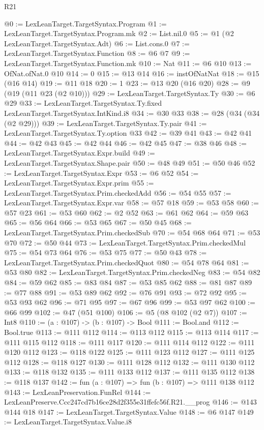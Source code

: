 \begin{lexlean}{R21}
\begin{coremodule}
@0 := LexLeanTarget.TargetSyntax.Program
@1 := LexLeanTarget.TargetSyntax.Program.mk
@2 := List.nil.{0}
@5 := @1 (@2 LexLeanTarget.TargetSyntax.Adt)
@6 := List.cons.{0}
@7 := LexLeanTarget.TargetSyntax.Function
@8 := @6 @7
@9 := LexLeanTarget.TargetSyntax.Function.mk
@10 := Nat
@11 := @6 @10
@13 := OfNat.ofNat.{0} @10
@14 := 0
@15 := @13 @14
@16 := instOfNatNat
@18 := @15 (@16 @14)
@19 := @11 @18
@20 := 1
@23 := @13 @20 (@16 @20)
@28 := @9 (@19 (@11 @23 (@2 @10)))
@29 := LexLeanTarget.TargetSyntax.Ty
@30 := @6 @29
@33 := LexLeanTarget.TargetSyntax.Ty.fixed LexLeanTarget.TargetSyntax.IntKind.i8
@34 := @30 @33
@38 := @28 (@34 (@34 (@2 @29)))
@39 := LexLeanTarget.TargetSyntax.Ty.pair
@41 := LexLeanTarget.TargetSyntax.Ty.option @33
@42 := @39 @41
@43 := @42 @41
@44 := @42 @43
@45 := @42 @44
@46 := @42 @45
@47 := @38 @46
@48 := LexLeanTarget.TargetSyntax.Expr.build
@49 := LexLeanTarget.TargetSyntax.Shape.pair
@50 := @48 @49
@51 := @50 @46
@52 := LexLeanTarget.TargetSyntax.Expr
@53 := @6 @52
@54 := LexLeanTarget.TargetSyntax.Expr.prim
@55 := LexLeanTarget.TargetSyntax.Prim.checkedAdd
@56 := @54 @55
@57 := LexLeanTarget.TargetSyntax.Expr.var
@58 := @57 @18
@59 := @53 @58
@60 := @57 @23
@61 := @53 @60
@62 := @2 @52
@63 := @61 @62
@64 := @59 @63
@65 := @56 @64
@66 := @53 @65
@67 := @50 @45
@68 := LexLeanTarget.TargetSyntax.Prim.checkedSub
@70 := @54 @68 @64
@71 := @53 @70
@72 := @50 @44
@73 := LexLeanTarget.TargetSyntax.Prim.checkedMul
@75 := @54 @73 @64
@76 := @53 @75
@77 := @50 @43
@78 := LexLeanTarget.TargetSyntax.Prim.checkedQuot
@80 := @54 @78 @64
@81 := @53 @80
@82 := LexLeanTarget.TargetSyntax.Prim.checkedNeg
@83 := @54 @82
@84 := @59 @62
@85 := @83 @84
@87 := @53 @85 @62
@88 := @81 @87
@89 := @77 @88
@91 := @53 @89 @62
@92 := @76 @91
@93 := @72 @92
@95 := @53 @93 @62
@96 := @71 @95
@97 := @67 @96
@99 := @53 @97 @62
@100 := @66 @99
@102 := @47 (@51 @100)
@106 := @5 (@8 @102 (@2 @7))
@107 := Int8
@110 := (a : @107) -> (b : @107) -> Bool
@111 := Bool.and
@112 := Bool.true
@113 := @111 @112
@114 := @113 @112
@115 := @113 @114
@117 := @111 @115 @112
@118 := @111 @117
@120 := @111 @114 @112
@122 := @111 @120 @112
@123 := @118 @122
@125 := @111 @123 @112
@127 := @111 @125 @112
@128 := @118 @127
@130 := @111 @128 @112
@132 := @111 @130 @112
@133 := @118 @132
@135 := @111 @133 @112
@137 := @111 @135 @112
@138 := @118 @137
@142 := fun (a : @107) => fun (b : @107) => @111 @138 @112
@143 := LexLeanPreservation.FunRel
@144 := LexLeanPreserve.Ccc247cd7b16ce28d2f355e31ffefc56f.R21.__prog
@146 := @143 @144 @18
@147 := LexLeanTarget.TargetSyntax.Value
@148 := @6 @147
@149 := LexLeanTarget.TargetSyntax.Value.i8

\end{coremodule}
\end{lexlean}
